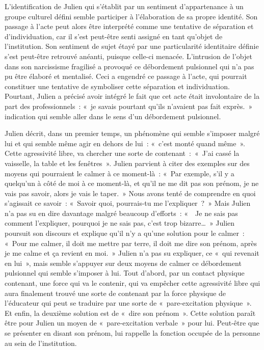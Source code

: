 \documentclass[12pt, a4paper]{book}
\begin{document}
\begin{spacing}{1.5}
L'identification de Julien qui s'établit par un sentiment d'appartenance à un groupe culturel défini semble participer à l'élaboration de sa propre identité. Son passage à l'acte peut alors être interprété comme une tentative de séparation et d'individuation, car il s'est peut-être senti assigné en tant qu'objet de l'institution. Son sentiment de sujet étayé par une particularité identitaire définie s'est peut-être retrouvé anéanti, puisque celle-ci menacée. L'intrusion de l'objet dans son narcissisme fragilisé a provoqué ce débordement pulsionnel qui n'a pas pu être élaboré et mentalisé.  Ceci  a engendré ce passage à l'acte, qui pourrait constituer  une tentative  de symboliser cette séparation et individuation. Pourtant, Julien a précisé avoir intégré le fait que cet acte était involontaire de la part des professionnels : « je savais pourtant qu'ils n'avaient pas fait exprès. » indication qui semble aller dans le sens d'un débordement pulsionnel.  

Julien décrit, dans un premier temps, un phénomène qui semble s'imposer malgré lui et qui semble même agir en dehors de lui : « c'est monté quand même ». Cette agressivité libre, va chercher une sorte de contenant : « J'ai cassé la vaisselle, la table et les fenêtres ». Julien parvient à citer des exemples sur des moyens qui pourraient le calmer à ce moment-là : « Par exemple, s'il y a quelqu'un à côté de moi à ce moment-là, et qu'il ne me dit pas son prénom, je ne vais pas savoir, alors je vais le taper. » Nous avons tenté de comprendre en quoi s'agissait ce savoir : « Savoir quoi, pourrais-tu me l'expliquer ? » Mais Julien n'a pas su en dire davantage malgré beaucoup d'efforts : «  Je ne sais pas comment l'expliquer, pourquoi je ne sais pas, c'est trop bizarre… » Julien poursuit son discours et explique qu'il n'y a qu'une solution pour le calmer : « Pour me calmer, il doit me mettre par terre, il doit me dire son prénom, après je me calme et ça revient en moi. » Julien n'a pas su expliquer, ce « qui revenait en lui », mais semble s'appuyer sur deux moyens de calmer ce débordement pulsionnel qui semble s'imposer à lui. Tout d'abord, par un contact physique contenant, une force qui va le contenir, qui va empêcher cette agressivité libre qui aura finalement trouvé une sorte de contenant par la force physique de l'éducateur qui peut se traduire par une sorte de « pare-excitation physique ». Et enfin, la deuxième solution est de « dire son prénom ». Cette solution paraît être pour Julien un moyen de « pare-excitation verbale » pour lui. Peut-être que se présenter en disant son prénom, lui rappelle la fonction occupée de la personne au sein de l'institution.


\end{spacing}
\end{document}
